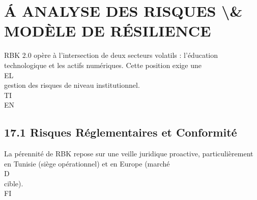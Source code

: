 \documentclass[12pt,landscape,a4paper]{article}
\begin{document}
\section{Á ANALYSE DES RISQUES \textbackslash{}& MODÈLE DE RÉSILIENCE}
\vspace{0.5em}
\vspace{0.5em}
RBK 2.0 opère à l’intersection de deux secteurs volatils : l’éducation technologique et les actifs numériques. Cette position exige une\\
\vspace{0.5em}
\vspace{0.5em}
\vspace{0.5em}
\vspace{0.5em}
EL\\
gestion des risques de niveau institutionnel.\\
\vspace{0.5em}
\vspace{0.5em}
\vspace{0.5em}
\vspace{0.5em}
TI\\
EN\\
\subsection{17.1 Risques Réglementaires et Conformité}
La pérennité de RBK repose sur une veille juridique proactive, particulièrement en Tunisie (siège opérationnel) et en Europe (marché\\
\vspace{0.5em}
\vspace{0.5em}
\vspace{0.5em}
\vspace{0.5em}
D\\
cible).\\
\vspace{0.5em}
\vspace{0.5em}
\vspace{0.5em}
\vspace{0.5em}
FI\\
\end{document}
